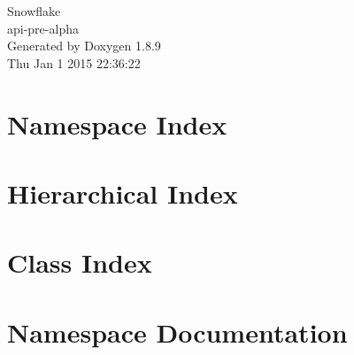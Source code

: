 \documentclass[twoside]{book}
\newcommand{\+}{\discretionary{\mbox{\scriptsize$\hookleftarrow$}}{}{}}
\newcommand{\clearemptydoublepage}{%
  \newpage{\pagestyle{empty}\cleardoublepage}%
}
\begin{document}
\hypersetup{pageanchor=false,
             bookmarks=true,
             bookmarksnumbered=true,
             pdfencoding=unicode
            }
\begin{titlepage}
\vspace*{7cm}
\begin{center}%
{\Large Snowflake \\[1ex]\large api-\/pre-\/alpha }\\
\vspace*{1cm}
{\large Generated by Doxygen 1.8.9}\\
\vspace*{0.5cm}
{\small Thu Jan 1 2015 22:36:22}\\
\end{center}
\end{titlepage}
\clearemptydoublepage
\tableofcontents
\clearemptydoublepage
{}
\hypersetup{pageanchor=true}

\chapter{Namespace Index}

\chapter{Hierarchical Index}

\chapter{Class Index}

\chapter{Namespace Documentation}






















\end{document}
